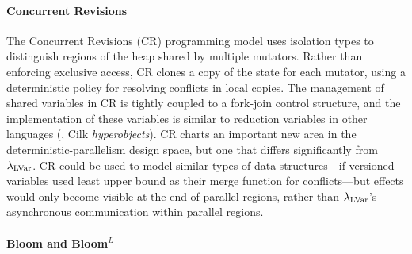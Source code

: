 \paragraph{Concurrent Revisions}
The Concurrent Revisions (CR) 
\cite{concurrent-revisions-haskell11}
programming model uses isolation types to distinguish regions of the heap shared
by multiple mutators.  Rather than enforcing exclusive access, CR
clones a copy of the state for each mutator, using a
deterministic policy for resolving conflicts in local copies.
%
The management of shared variables in CR is tightly coupled to a
fork-join control structure, and the implementation of these variables
is similar to reduction variables in other languages (\eg, Cilk
{\em hyperobjects}).
%
CR charts an important new area in the deterministic-parallelism
design space, but one that differs significantly from
$\lambda_{\textrm{LVar}}$.  CR could be used to model similar types of data
structures---if versioned variables used least upper bound as their merge function
for conflicts---but effects would only become visible at the end of
parallel regions, rather than $\lambda_{\textrm{LVar}}$'s asynchronous communication within
parallel regions.



\paragraph{Bloom and Bloom$^L$}


